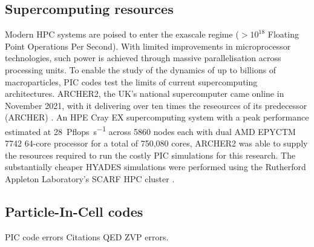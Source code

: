 \subsection{Supercomputing resources}\label{sec:intro-archer}
Modern \ac{HPC} systems are poised to enter the exascale regime ($> 10^{18}$ Floating Point Operations Per Second). With limited improvements in microprocessor technologies, such power is achieved through massive parallelisation across processing units. To enable the study of the dynamics of up to billions of macroparticles, PIC codes test the limits of current supercomputing architectures. ARCHER2, the UK's national supercomputer came online in November 2021, with it delivering over ten times the reseources of its predecessor (ARCHER) \cite{ARCHER2}. An HPE Cray EX supercomputing system with a peak performance estimated at \qty{28}{Pflops.s^{-1}} across 5860 nodes each with dual AMD EPYCTM 7742 64-core processor for a total of 750,080 cores, ARCHER2 was able to supply the resources required to run the costly PIC simulations for this research. The substantially cheaper HYADES simulations were performed using the Rutherford Appleton Laboratory's SCARF \ac{HPC} cluster \cite{SCARFOverview}.

\subsection{Particle-In-Cell codes}
PIC code errors
Citations
QED
ZVP errors.


